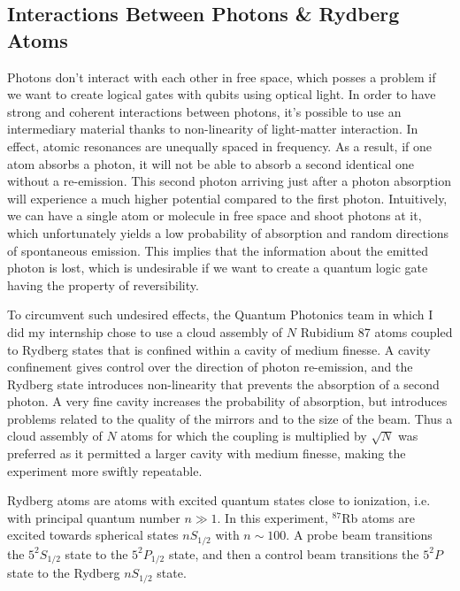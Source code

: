 \subsection{Interactions Between Photons \& Rydberg Atoms}

Photons don't interact with each other in free space, which posses a problem if we want to create logical gates with qubits using optical light. In order to have strong and coherent interactions between photons, it's possible to use an intermediary material thanks to non-linearity of light-matter interaction. In effect, atomic resonances are unequally spaced in frequency. As a result, if one atom absorbs a photon, it will not be able to absorb a second identical one without a re-emission. This second photon arriving just after a photon absorption will experience a much higher potential compared to the first photon. Intuitively, we can have a single atom or molecule in free space and shoot photons at it, which unfortunately yields a low probability of absorption and random directions of spontaneous emission. This implies that the information about the emitted photon is lost, which is undesirable if we want to create a quantum logic gate having the property of reversibility.

To circumvent such undesired effects, the Quantum Photonics team in which I did my internship chose to use a cloud assembly of $N$ Rubidium 87 atoms coupled to Rydberg states that is confined within a cavity of medium finesse. A cavity confinement gives control over the direction of photon re-emission, and the Rydberg state introduces non-linearity that prevents the absorption of a second photon. A very fine cavity increases the probability of absorption, but introduces problems related to the quality of the mirrors and to the size of the beam. Thus a cloud assembly of $N$ atoms for which the coupling is multiplied by $\sqrt{N}$ was preferred as it permitted a larger cavity with medium finesse, making the experiment more swiftly repeatable.

Rydberg atoms are atoms with excited quantum states close to ionization, i.e. with principal quantum number $n \gg 1$. In this experiment, $^{87}$Rb atoms are excited towards spherical states $nS_{1/2}$ with $n \sim 100$. A probe beam transitions the $5^2S_{1/2}$ state to the $5^2P_{1/2}$ state, and then a control beam transitions the $5^2P$ state to the Rydberg $nS_{1/2}$ state.

